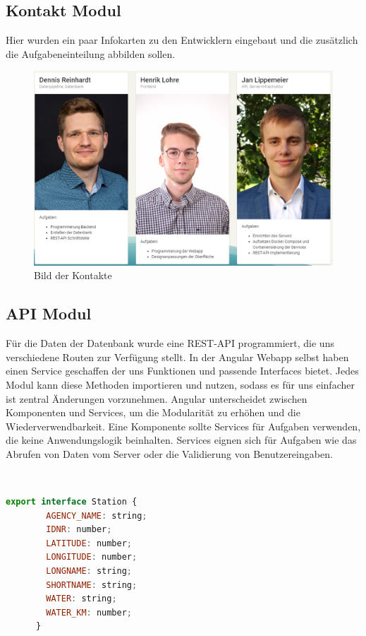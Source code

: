 \subsection{Kontakt Modul}

Hier wurden ein paar Infokarten zu den Entwicklern eingebaut und die zusätzlich die Aufgabeneinteilung abbilden sollen.

\begin{figure}[!htb]
 \centering
 \includegraphics[width=13cm]{figures/Kontakt.PNG}
 \caption{Bild der Kontakte}
 \label{fig:Bild der Kontakte}
\end{figure}

\newpage
\subsection{API Modul}

Für die Daten der Datenbank wurde eine REST-API programmiert, die uns verschiedene Routen zur Verfügung stellt. In der Angular Webapp selbst haben einen Service geschaffen der uns Funktionen und passende Interfaces bietet. Jedes Modul kann diese Methoden importieren und nutzen, sodass es für uns einfacher ist zentral Änderungen vorzunehmen. Angular unterscheidet zwischen Komponenten und Services, um die Modularität zu erhöhen und die Wiederverwendbarkeit.
Eine Komponente sollte Services für Aufgaben verwenden, die keine Anwendungslogik beinhalten. Services eignen sich für Aufgaben wie das Abrufen von Daten vom Server oder die Validierung von Benutzereingaben.

~\\
\begin{lstlisting}[language={JavaScript}, caption={Beispiel: DbContext eines Interfaces}, captionpos=b, label={Script}]
    export interface Station {
        AGENCY_NAME: string;
        IDNR: number;
        LATITUDE: number;
        LONGITUDE: number;
        LONGNAME: string;
        SHORTNAME: string;
        WATER: string;
        WATER_KM: number;
      }
\end{lstlisting}~\\